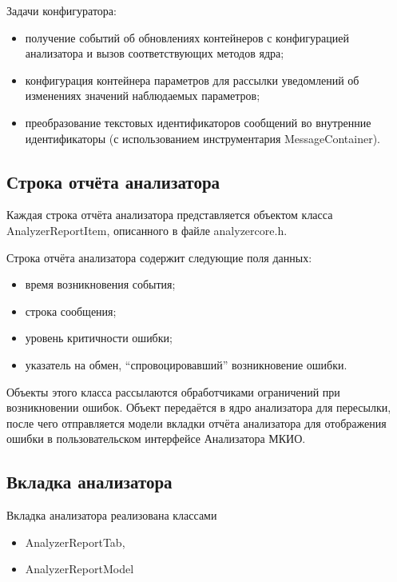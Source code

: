 Задачи конфигуратора:

\begin{itemize}
 \item получение событий об обновлениях контейнеров с конфигурацией анализатора 
и вызов соответствующих методов ядра;
 \item конфигурация контейнера параметров для рассылки уведомлений об 
изменениях значений наблюдаемых параметров;
 \item преобразование текстовых идентификаторов сообщений во внутренние 
идентификаторы (с использованием инструментария MessageContainer).
\end{itemize}

\subsection*{Строка отчёта анализатора}
\label{subsec:reportitem}

Каждая строка отчёта анализатора представляется объектом класса 
AnalyzerReportItem, описанного в файле analyzercore.h.

Строка отчёта анализатора содержит следующие поля данных:

\begin{itemize}
 \item время возникновения события;
 \item строка сообщения;
 \item уровень критичности ошибки;
 \item указатель на обмен, ``спровоцировавший'' возникновение ошибки.
\end{itemize}

Объекты этого класса рассылаются обработчиками ограничений при возникновении 
ошибок. Объект передаётся в ядро анализатора для пересылки, после чего 
отправляется модели вкладки отчёта анализатора для отображения ошибки в 
пользовательском интерфейсе Анализатора МКИО.

\subsection*{Вкладка анализатора}

Вкладка анализатора реализована классами

\begin{itemize}
 \item AnalyzerReportTab,
 \item AnalyzerReportModel
\end{itemize}

